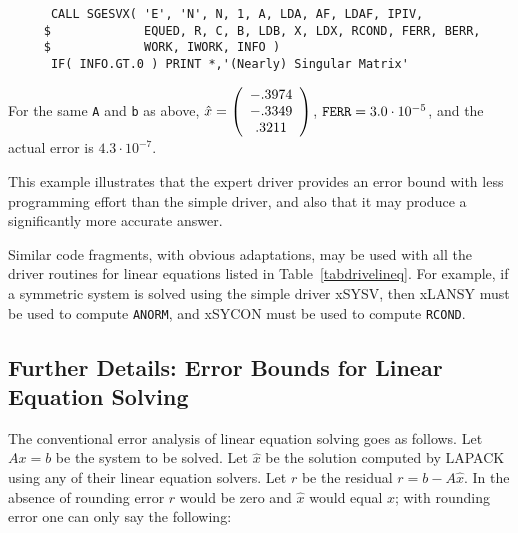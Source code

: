 \begin{enumerate}
\begin{verbatim}
      CALL SGESVX( 'E', 'N', N, 1, A, LDA, AF, LDAF, IPIV,
     $             EQUED, R, C, B, LDB, X, LDX, RCOND, FERR, BERR,
     $             WORK, IWORK, INFO )
      IF( INFO.GT.0 ) PRINT *,'(Nearly) Singular Matrix'
\end{verbatim}

For the same {\tt A} and {\tt b} as above,
$\hat{x} = \bmat{c} -.3974 \\ -.3349 \\ .3211 \emat$,
${\tt FERR} = 3.0 \cdot 10^{-5}$,
and the actual error is $4.3 \cdot 10^{-7}$.

\end{enumerate}

This example illustrates
that the expert driver provides an error bound with less programming
effort than the simple driver, and also that it may produce a significantly
more accurate answer.

Similar code fragments, with obvious adaptations,
may be used with all the driver routines for linear
equations listed in Table~\ref{tabdrivelineq}.
For example, if a symmetric system is solved using the simple driver 
xSYSV,
then xLANSY 
must be used to compute {\tt ANORM}, and
xSYCON must be used
to compute {\tt RCOND}.

\subsection{Further Details:  Error Bounds for Linear Equation Solving}\label{secbackgroundAx=b}

The conventional error analysis of linear
equation solving goes as follows.
Let $Ax=b$ be the system to be solved. Let $\hat{x}$ be the solution
computed by LAPACK using any of their linear equation solvers.
Let $r$ be
the residual $r = b - A \hat{x}$. In the absence of rounding error $r$
would be zero and $\hat{x}$ would equal $x$; with rounding error one can
only say the following:

